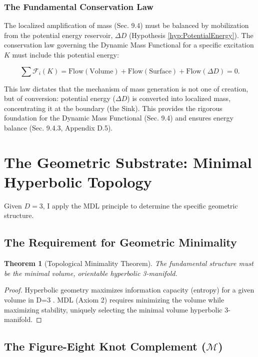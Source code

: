 \documentclass[11pt, a4paper]{article}
\newtheorem{theorem}{Theorem}[section]
\theoremstyle{definition}
\theoremstyle{definition}
\newcommand{\M}{\mathcal{M}}
\newcommand{\Fcal}{\mathcal{F}} %
\begin{document}
\subsubsection{The Fundamental Conservation Law}

The localized amplification of mass (Sec. 9.4) must be balanced by mobilization from the potential energy reservoir, $\Delta D$ (Hypothesis \ref{hyp:PotentialEnergy}). The conservation law governing the Dynamic Mass Functional for a specific excitation $K$ must include this potential energy:

\begin{equation}\label{eq:InfoConservationLaw}
    \sum \Fcal_i(K) = \text{Flow}(\text{Volume}) + \text{Flow}(\text{Surface}) + \text{Flow}(\Delta D) = 0.
\end{equation}

This law dictates that the mechanism of mass generation is not one of creation, but of conversion: potential energy ($\Delta D$) is converted into localized mass, concentrating it at the boundary (the Sink). This provides the rigorous foundation for the Dynamic Mass Functional (Sec. 9.4) and ensures energy balance (Sec. 9.4.3, Appendix D.5).

\section{The Geometric Substrate: Minimal Hyperbolic Topology}

Given $D=3$, I apply the MDL principle to determine the specific geometric structure.

\subsection{The Requirement for Geometric Minimality}

\begin{theorem}[Topological Minimality Theorem]
The fundamental structure must be the minimal volume, orientable hyperbolic 3-manifold.
\end{theorem}
\begin{proof}
Hyperbolic geometry maximizes information capacity (entropy) for a given volume in D=3 \cite{Gromov1987}. MDL (Axiom 2) requires minimizing the volume while maximizing stability, uniquely selecting the minimal volume hyperbolic 3-manifold.
\end{proof}

\subsection{The Figure-Eight Knot Complement (\texorpdfstring{$\M$}{M})}
\end{document}
